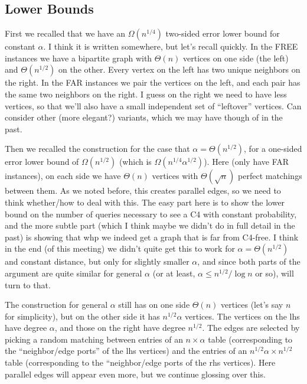 \documentclass{article}
\begin{document}
\subsection{Lower Bounds}

First we recalled that we have an $\Omega(n^{1/4})$ two-sided error lower bound for constant $\alpha$. I think it is written somewhere, but let's recall quickly. In the FREE instances we have a bipartite graph with $\Theta(n)$ vertices on one side (the left) and $\Theta(n^{1/2})$ on the other. Every vertex on the left has two unique neighbors on the right. In the FAR instances we pair the vertices on the left, and each pair has the same two neighbors on the right. I guess on the right we need to have less vertices, so that we'll also have a small independent set of ``leftover'' vertices. Can consider other (more elegant?) variants, which we may have though of in the past.

Then we recalled the construction for the case that $\alpha = \Theta(n^{1/2})$, for a one-sided error lower bound of $\Omega(n^{1/2})$ (which is $\Omega(n^{1/4} \alpha^{1/2})$). Here (only have FAR instances), on each side we have $\Theta(n)$ vertices with $\Theta(\sqrt{n})$ perfect matchings between them. As we noted before, this creates parallel edges, so we need to think whether/how to deal with this. The easy part here is to show the lower bound on the number of queries necessary to see a C4  with constant probability, and the more subtle part (which I think maybe we didn't do in full detail in the past) is showing that whp we indeed get a graph that is far from C4-free. I think in the end (of this meeting) we didn't quite get this to work for $\alpha = \Theta(n^{1/2})$ and constant distance, but only for slightly smaller $\alpha$, and since  both parts of the argument are quite similar for general $\alpha$ (or at least, $\alpha \leq n^{1/2}/\log n$ or so), will turn to that.

The construction for general $\alpha$ still has on one side $\Theta(n)$ vertices (let's say $n$ for simplicity), but on the other side it has $n^{1/2}\alpha$ vertices. The vertices on the lhs have degree $\alpha$, and those on the right have degree $n^{1/2}$.
The edges are selected by picking a random matching between entries of an $n\times \alpha$ table (corresponding to the ``neighbor/edge ports'' of the lhs vertices) and the entries of an $n^{1/2}\alpha \times n^{1/2}$ table (corresponding to the ``neighbor/edge ports of the rhs vertices). Here parallel edges will appear even more, but we continue glossing over this.
\end{document}
